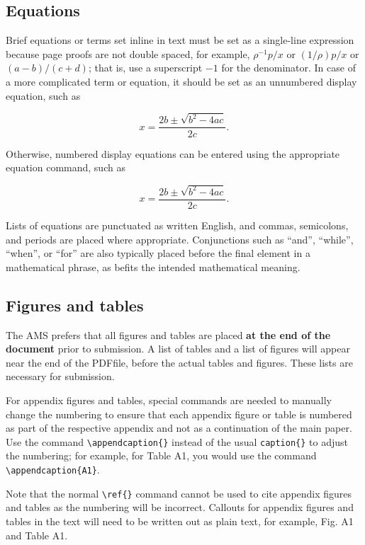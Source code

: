 \documentclass[draft]{ametsoc}
\begin{document}
\hypertarget{equations}{%
\subsection{Equations}\label{equations}}

Brief equations or terms set inline in text must be set as a single-line
expression because page proofs are not double spaced, for example,
\(\rho^{-1}p/x\) or \((1/{\rho})p/x\) or \((a-b)/(c+d)\); that is, use a
superscript \(-1\) for the denominator. In case of a more complicated
term or equation, it should be set as an unnumbered display equation,
such as

\[
x=\frac{2b\pm\sqrt{b^{2}-4ac}}{2c}.
\]

Otherwise, numbered display equations can be entered using the
appropriate equation command, such as

\begin{equation}
x=\frac{2b\pm\sqrt{b^{2}-4ac}}{2c}.  
\end{equation}

Lists of equations are punctuated as written English, and commas,
semicolons, and periods are placed where appropriate. Conjunctions such
as ``and'', ``while'', ``when'', or ``for'' are also typically placed
before the final element in a mathematical phrase, as befits the
intended mathematical meaning.

\hypertarget{figures-and-tables}{%
\subsection{Figures and tables}\label{figures-and-tables}}

The AMS prefers that all figures and tables are placed \textbf{at the
end of the document} prior to submission. A list of tables and a list of
figures will appear near the end of the PDFfile, before the actual
tables and figures. These lists are necessary for submission.

For appendix figures and tables, special commands are needed to manually
change the numbering to ensure that each appendix figure or table is
numbered as part of the respective appendix and not as a continuation of
the main paper. Use the command
\texttt{\textbackslash{}appendcaption\{\}} instead of the usual
\texttt{caption\{\}} to adjust the numbering; for example, for Table A1,
you would use the command \texttt{\textbackslash{}appendcaption\{A1\}}.

Note that the normal \texttt{\textbackslash{}ref\{\}} command cannot be
used to cite appendix figures and tables as the numbering will be
incorrect. Callouts for appendix figures and tables in the text will
need to be written out as plain text, for example, Fig. A1 and Table A1.
\end{document}
